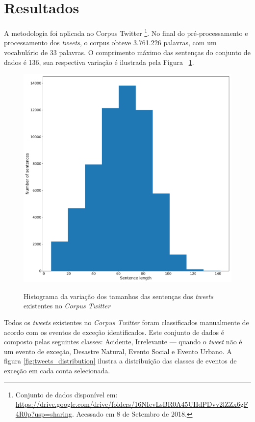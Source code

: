 \documentclass[
	12pt,				%
	oneside,			%
	a4paper,			%
	english,			%
	brazil				%
	]{abntex2ppgsi}
\begin{document}
\section{Resultados}
	
A metodologia foi aplicada ao Corpus Twitter \footnote{Conjunto de dados disponível em: \url{https://drive.google.com/drive/folders/16NIevLsBR0A45UHdPDvv2lZZx6gF4R0p?usp=sharing}. Acessado em 8 de Setembro de 2018.}. No final do pré-processamento e processamento dos \textit{tweets}, o corpus obteve 3.761.226 palavras, com um vocabulário de 33 palavras. O comprimento máximo das sentenças do conjunto de dados é 136, sua respectiva variação é ilustrada pela Figura ~\ref{fig:corpus_metrics}.
 
\begin{figure}[!htb]
	\centering
 	  \caption{Histograma da variação dos tamanhos das sentenças dos \textit{tweets} existentes no \textit{Corpus Twitter}}
		\includegraphics[width=1\linewidth]{images/corpus_metrics.png}
	\label{fig:corpus_metrics}
\end{figure}

Todos os \textit{tweets} existentes no \textit{Corpus Twitter} foram classificados manualmente de acordo com os eventos de exceção identificados. Este conjunto de dados é composto pelas seguintes classes: Acidente, Irrelevante --- quando o \textit{tweet} não é um evento de exceção, Desastre Natural, Evento Social e Evento Urbano. A figura \ref{fig:tweets_distribution} ilustra a distribuição das classes de eventos de exceção em cada conta selecionada.
\end{document}
